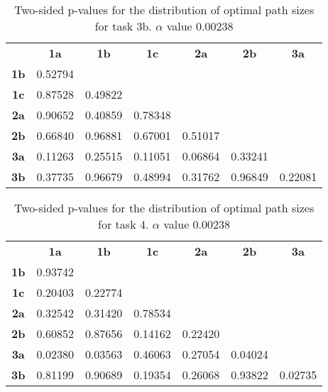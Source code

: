 \begin{table}[h!]
    \centering
    \begin{tabular}{ccccccc}
                & \textbf{1a}  & \textbf{1b}  & \textbf{1c}  & \textbf{2a}  & \textbf{2b}  & \textbf{3a}  \\
    \textbf{1b} & 0.52794 &         &         &         &         &         \\
    \textbf{1c} & 0.87528 & 0.49822 &         &         &         &         \\
    \textbf{2a} & 0.90652 & 0.40859 & 0.78348 &         &         &         \\
    \textbf{2b} & 0.66840 & 0.96881 & 0.67001 & 0.51017 &         &         \\
    \textbf{3a} & 0.11263 & 0.25515 & 0.11051 & 0.06864 & 0.33241 &         \\
    \textbf{3b} & 0.37735 & 0.96679 & 0.48994 & 0.31762 & 0.96849 & 0.22081
    \end{tabular}
    \caption[Experiment 2: p-table for path sizes (task 3b)]{Two-sided p-values for the distribution of optimal path sizes for task 3b. \(\alpha\) value 0.00238}
    \label{tab:exp2.pathsize3b}
\end{table}

\begin{table}[h!]
    \centering
    \begin{tabular}{ccccccc}
                & \textbf{1a}  & \textbf{1b}  & \textbf{1c}  & \textbf{2a}  & \textbf{2b}  & \textbf{3a}  \\
    \textbf{1b} & 0.93742 &         &         &         &         &         \\
    \textbf{1c} & 0.20403 & 0.22774 &         &         &         &         \\
    \textbf{2a} & 0.32542 & 0.31420 & 0.78534 &         &         &         \\
    \textbf{2b} & 0.60852 & 0.87656 & 0.14162 & 0.22420 &         &         \\
    \textbf{3a} & 0.02380 & 0.03563 & 0.46063 & 0.27054 & 0.04024 &         \\
    \textbf{3b} & 0.81199 & 0.90689 & 0.19354 & 0.26068 & 0.93822 & 0.02735
    \end{tabular}
    \caption[Experiment 2: p-table for path sizes (task 4)]{Two-sided p-values for the distribution of optimal path sizes for task 4. \(\alpha\) value 0.00238}
    \label{tab:exp2.pathsize4}
\end{table}

\newpage